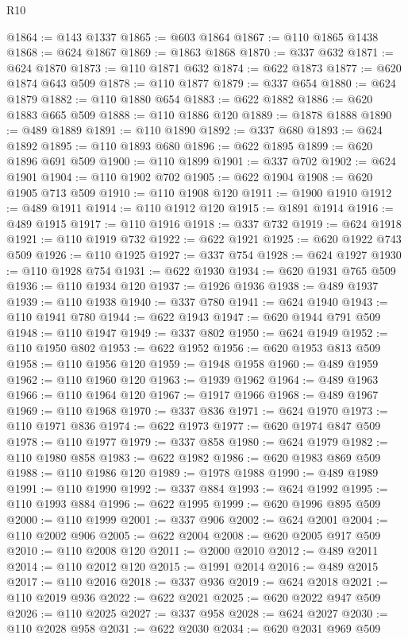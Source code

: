 \begin{lexlean}{R10}
\begin{coremodule}
@1864 := @143 @1337
@1865 := @603 @1864
@1867 := @110 @1865 @1438
@1868 := @624 @1867
@1869 := @1863 @1868
@1870 := @337 @632
@1871 := @624 @1870
@1873 := @110 @1871 @632
@1874 := @622 @1873
@1877 := @620 @1874 @643 @509
@1878 := @110 @1877
@1879 := @337 @654
@1880 := @624 @1879
@1882 := @110 @1880 @654
@1883 := @622 @1882
@1886 := @620 @1883 @665 @509
@1888 := @110 @1886 @120
@1889 := @1878 @1888
@1890 := @489 @1889
@1891 := @110 @1890
@1892 := @337 @680
@1893 := @624 @1892
@1895 := @110 @1893 @680
@1896 := @622 @1895
@1899 := @620 @1896 @691 @509
@1900 := @110 @1899
@1901 := @337 @702
@1902 := @624 @1901
@1904 := @110 @1902 @702
@1905 := @622 @1904
@1908 := @620 @1905 @713 @509
@1910 := @110 @1908 @120
@1911 := @1900 @1910
@1912 := @489 @1911
@1914 := @110 @1912 @120
@1915 := @1891 @1914
@1916 := @489 @1915
@1917 := @110 @1916
@1918 := @337 @732
@1919 := @624 @1918
@1921 := @110 @1919 @732
@1922 := @622 @1921
@1925 := @620 @1922 @743 @509
@1926 := @110 @1925
@1927 := @337 @754
@1928 := @624 @1927
@1930 := @110 @1928 @754
@1931 := @622 @1930
@1934 := @620 @1931 @765 @509
@1936 := @110 @1934 @120
@1937 := @1926 @1936
@1938 := @489 @1937
@1939 := @110 @1938
@1940 := @337 @780
@1941 := @624 @1940
@1943 := @110 @1941 @780
@1944 := @622 @1943
@1947 := @620 @1944 @791 @509
@1948 := @110 @1947
@1949 := @337 @802
@1950 := @624 @1949
@1952 := @110 @1950 @802
@1953 := @622 @1952
@1956 := @620 @1953 @813 @509
@1958 := @110 @1956 @120
@1959 := @1948 @1958
@1960 := @489 @1959
@1962 := @110 @1960 @120
@1963 := @1939 @1962
@1964 := @489 @1963
@1966 := @110 @1964 @120
@1967 := @1917 @1966
@1968 := @489 @1967
@1969 := @110 @1968
@1970 := @337 @836
@1971 := @624 @1970
@1973 := @110 @1971 @836
@1974 := @622 @1973
@1977 := @620 @1974 @847 @509
@1978 := @110 @1977
@1979 := @337 @858
@1980 := @624 @1979
@1982 := @110 @1980 @858
@1983 := @622 @1982
@1986 := @620 @1983 @869 @509
@1988 := @110 @1986 @120
@1989 := @1978 @1988
@1990 := @489 @1989
@1991 := @110 @1990
@1992 := @337 @884
@1993 := @624 @1992
@1995 := @110 @1993 @884
@1996 := @622 @1995
@1999 := @620 @1996 @895 @509
@2000 := @110 @1999
@2001 := @337 @906
@2002 := @624 @2001
@2004 := @110 @2002 @906
@2005 := @622 @2004
@2008 := @620 @2005 @917 @509
@2010 := @110 @2008 @120
@2011 := @2000 @2010
@2012 := @489 @2011
@2014 := @110 @2012 @120
@2015 := @1991 @2014
@2016 := @489 @2015
@2017 := @110 @2016
@2018 := @337 @936
@2019 := @624 @2018
@2021 := @110 @2019 @936
@2022 := @622 @2021
@2025 := @620 @2022 @947 @509
@2026 := @110 @2025
@2027 := @337 @958
@2028 := @624 @2027
@2030 := @110 @2028 @958
@2031 := @622 @2030
@2034 := @620 @2031 @969 @509

\end{coremodule}
\end{lexlean}
